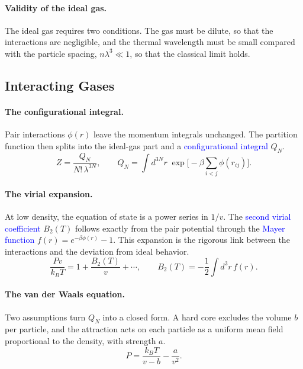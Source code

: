 \paragraph{Validity of the ideal gas.}
The ideal gas requires two conditions. The gas must be dilute, so that the
interactions are negligible, and the thermal wavelength must be small
compared with the particle spacing, $n\lambda^3\ll1$, so that the classical
limit holds.

\subsection{Interacting Gases}

\paragraph{The configurational integral.}
Pair interactions $\phi(r)$ leave the momentum integrals unchanged. The
partition function then splits into the ideal-gas part and a
\textcolor{blue}{configurational integral} $Q_N$.
\begin{equation}
    \boxed{Z=\frac{Q_N}{N!\,\lambda^{3N}},\qquad
    Q_N=\int d^{3N}r\;\exp\!\Big[-\beta\sum_{i<j}\phi(r_{ij})\Big].}
\end{equation}

\paragraph{The virial expansion.}
At low density, the equation of state is a power series in $1/v$. The
\textcolor{blue}{second virial coefficient} $B_2(T)$ follows exactly from
the pair potential through the \textcolor{blue}{Mayer function}
$f(r)=e^{-\beta\phi(r)}-1$. This expansion is the rigorous link between the
interactions and the deviation from ideal behavior.
\begin{equation}
    \boxed{\frac{Pv}{k_BT}=1+\frac{B_2(T)}{v}+\cdots,\qquad
    B_2(T)=-\frac{1}{2}\int d^3r\,f(r).}
\end{equation}

\paragraph{The van der Waals equation.}
Two assumptions turn $Q_N$ into a closed form. A hard core excludes the
volume $b$ per particle, and the attraction acts on each particle as a
uniform mean field proportional to the density, with strength $a$.
\begin{equation}
    \boxed{P=\frac{k_BT}{v-b}-\frac{a}{v^2}.}
\end{equation}

